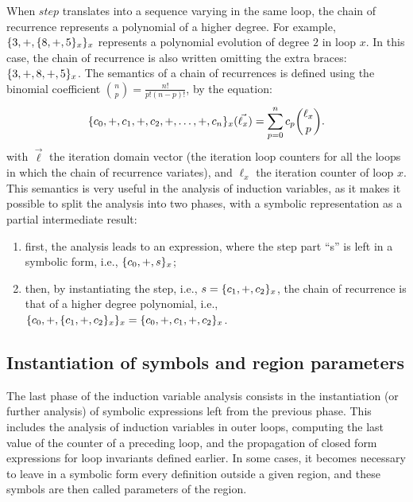 {When $step$ translates into a sequence varying in the same loop, the
chain of recurrence represents a polynomial of a higher degree.  For
example, $\{3, +, \{8, +, 5\}_x\}_x$ represents a polynomial
evolution of degree $2$ in loop $x$.  In this case, the chain of
recurrence is also written omitting the extra braces: $\{3, +, 8,
  +, 5\}_x$.  The semantics of a chain of recurrences is defined using
the binomial coefficient $\binom{n}{p} = \frac{n!}{p!(n-p)!}$, by the
equation:
\begin{equation*}
  \{c_0,+,c_1,+,c_2,+,\ldots,+,c_n\}_x(\vec{\ell_x})=
  \sum_{p=0}^{n}c_{p}\binom{\ell_x}{p}.
\end{equation*}
with $\vec{\ell}$ the iteration domain vector (the iteration loop
counters for all the loops in which the chain of recurrence variates),
and $\ell_x$ the iteration counter of loop $x$.  This semantics is
very useful in the analysis of induction variables, as it makes it
possible to split the analysis into two phases, with a symbolic
representation as a partial intermediate result:
\begin{enumerate}
\item first, the analysis leads to an expression, where the step
  part ``s'' is left in a symbolic form, i.e., $\{c_0, +, s\}_x$;
\item then, by instantiating the step, i.e., $s = \{c_1, +,
  c_2\}_x$, the chain of recurrence is that of a higher degree
  polynomial, i.e., $\{c_0, +, \{c_1, +, c_2\}_x\}_x =
  \{c_0, +, c_1, +, c_2\}_x$.
\end{enumerate}

\subsection{Instantiation of symbols and region parameters}

The last phase of the induction variable analysis consists in the
instantiation (or further analysis) of symbolic expressions left from
the previous phase.  This includes the analysis of induction variables
in outer loops, computing the last value of the counter of a preceding
loop, and the propagation of closed form expressions for loop
invariants defined earlier.  In some cases, it becomes necessary to
leave in a symbolic form every definition outside a given region, and
these symbols are then called parameters of the region.

}
